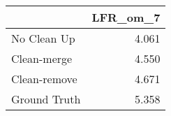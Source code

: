 \begin{tabular}{lr}
\toprule
{} & LFR_om_7 \\
\midrule
No Clean Up  &    4.061 \\
Clean-merge  &    4.550 \\
Clean-remove &    4.671 \\
Ground Truth &    5.358 \\
\bottomrule
\end{tabular}
